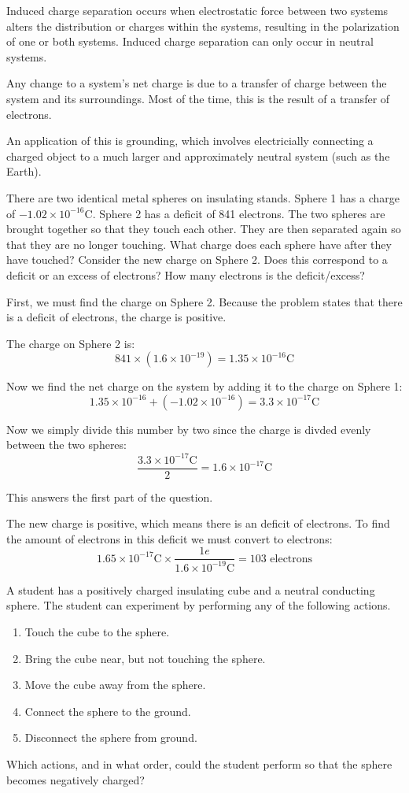\documentclass[../em.tex]{subfiles}
\begin{document}
Induced charge separation occurs when electrostatic force between two systems 
alters the distribution or charges within the systems, resulting in the polarization of 
one or both systems. Induced charge separation can only occur in neutral systems.

Any change to a system's net charge is due to a transfer of charge between the 
system and its surroundings. Most of the time, this is the result of a transfer of electrons.

An application of this is grounding, which involves electricially connecting 
a charged object to a much larger and approximately neutral system (such as the Earth).
\begin{example}
    There are two identical metal spheres on insulating stands. Sphere 1 has a charge of $-1.02 \times 10^{-16}$C. 
    Sphere 2 has a deficit of 841 electrons. The two spheres are brought together so that they touch each other. 
    They are then separated again so that they are no longer touching. What charge does each sphere have after 
    they have touched? Consider the new charge on Sphere 2. Does this correspond to a deficit or an excess of 
    electrons? How many electrons is the deficit/excess?

    First, we must find the charge on Sphere 2. Because the problem states that there is a deficit of electrons, the charge is positive.
    
    The charge on Sphere 2 is:
    \[841 \times (1.6\times 10^{-19}) = 1.35\times 10^{-16}\text{C}\]

    Now we find the net charge on the system by adding it to the charge on Sphere 1:
    \[1.35 \times 10^{-16} + (-1.02 \times 10^{-16}) = 3.3\times 10^{-17}\text{C}\]

    Now we simply divide this number by two since the charge is divded evenly between the two spheres:
    \[\frac{3.3\times 10^{-17}\text{C}}{2}=1.6\times 10^{-17}\text{C}\]
    
    This answers the first part of the question.

    The new charge is positive, which means there is an deficit of electrons. 
    To find the amount of electrons in this deficit we must convert to electrons:
    \[1.65\times10^{-17}\text{C}\times \frac{1e}{1.6\times10^{-19}\text{C}}=103\text{ electrons}\]
\end{example}

\ex A student has a positively charged insulating cube and a neutral conducting sphere. The student can experiment by performing any of the following actions.
\begin{enumerate}
    \item Touch the cube to the sphere.
    \item Bring the cube near, but not touching the sphere.
    \item Move the cube away from the sphere.
    \item Connect the sphere to the ground.
    \item Disconnect the sphere from ground.
\end{enumerate}
Which actions, and in what order, could the student perform so that the sphere becomes negatively charged?
\end{document}
